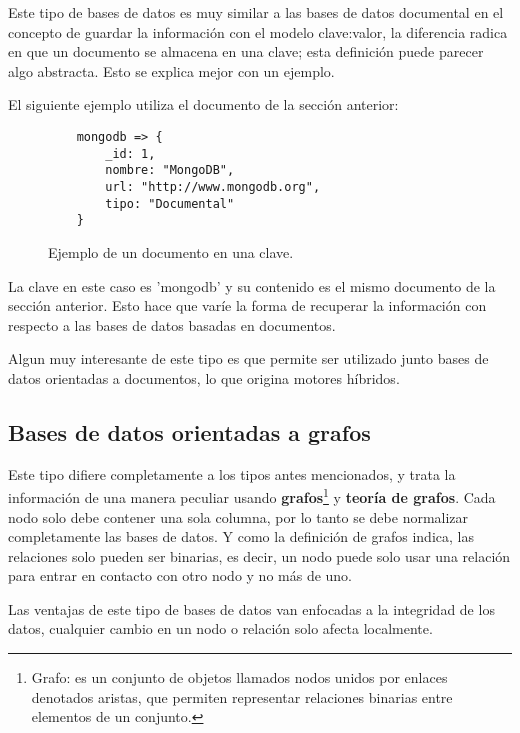 Este tipo de bases de datos es muy similar a las bases de datos documental en el concepto de guardar la informaci\'on con el modelo clave:valor, la diferencia radica en que un documento se almacena en una clave; esta definici\'on puede parecer algo abstracta. Esto se explica mejor con un ejemplo.

El siguiente ejemplo utiliza el documento de la secci\'on anterior:

\begin{figure}[!ht]
    \centering
    \begin{lstlisting}
    mongodb => {
	    _id: 1,
	    nombre: "MongoDB",
	    url: "http://www.mongodb.org",
	    tipo: "Documental"
    }
    \end{lstlisting}
    \caption[Bases de datos clave/valor]{Ejemplo de un documento en una clave.}
\end{figure}

La clave en este caso es 'mongodb' y su contenido es el mismo documento de la secci\'on anterior. Esto hace que var\'ie la forma de recuperar la informaci\'on con respecto a las bases de datos basadas en documentos.

Algun muy interesante de este tipo es que permite ser utilizado junto bases de datos orientadas a documentos, lo que origina motores h\'ibridos.

\subsection{Bases de datos orientadas a grafos}

Este tipo difiere completamente a los tipos antes mencionados, y trata la informaci\'on de una manera peculiar usando \textbf{grafos}\footnote{Grafo: es un conjunto de objetos llamados nodos unidos por enlaces denotados aristas, que permiten representar relaciones binarias entre elementos de un conjunto.} y \textbf{teor\'ia de grafos}. Cada nodo solo debe contener una sola columna, por lo tanto se debe normalizar completamente las bases de datos. Y como la definici\'on de grafos indica, las relaciones solo pueden ser binarias, es decir, un nodo puede solo usar una relaci\'on para entrar en contacto con otro nodo y no m\'as de uno.

Las ventajas de este tipo de bases de datos van enfocadas a la integridad de los datos, cualquier cambio en un nodo o relaci\'on solo afecta localmente.

